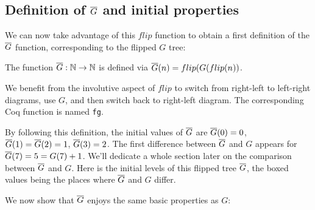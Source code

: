 \documentclass[a4paper,11pt]{article}
\begin{document}
\subsection{Definition of $\overline{G}$ and initial properties}

We can now take advantage of this $flip$ function to obtain
a first definition of the $\overline{G}$ function, corresponding to the
flipped $G$ tree:

\begin{definition}
The function $\overline{G} : \mathbb{N}\to\mathbb{N}$ is defined via
$\overline{G}(n) = flip(G(flip(n))$.
\end{definition}

We benefit from the involutive aspect of $flip$ to switch
from right-left to left-right diagrams, use $G$, and then
switch back to right-left diagram. The corresponding Coq function
is named {\tt fg}.

By following this definition, the initial values of $\overline{G}$ are
$\overline{G}(0)=0$, $\overline{G}(1)=\overline{G}(2)=1$, $\overline{G}(3)=2$. The first difference
between $\overline{G}$ and $G$ appears for $\overline{G}(7)=5=G(7)+1$. We'll dedicate a
whole section later on the comparison between $\overline{G}$ and $G$.
Here is the initial levels of this flipped tree $\overline{G}$,
the boxed values being the places where $\overline{G}$ and $G$ differ.

\bigskip


We now show that $\overline{G}$ enjoys the same basic properties as $G$:
\end{document}
